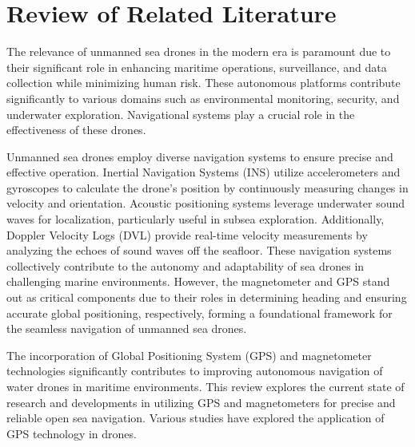 \chapter{Review of Related Literature}

The relevance of unmanned sea drones in the modern era is paramount due to their significant role in enhancing maritime 
operations, surveillance, and data collection while minimizing human risk. These autonomous platforms contribute 
significantly to various domains such as environmental monitoring, security, and underwater exploration. Navigational 
systems play a crucial role in the effectiveness of these drones.

Unmanned sea drones employ diverse navigation systems to ensure precise and effective operation. Inertial Navigation 
Systems (INS) utilize accelerometers and gyroscopes to calculate the drone's position by continuously measuring changes 
in velocity and orientation. Acoustic positioning systems leverage underwater sound waves for localization, particularly 
useful in subsea exploration. Additionally, Doppler Velocity Logs (DVL) provide real-time velocity measurements by 
analyzing the echoes of sound waves off the seafloor. These navigation systems collectively contribute to the autonomy 
and adaptability of sea drones in challenging marine environments. However, the magnetometer and GPS stand out as critical 
components due to their roles in determining heading and ensuring accurate global positioning, respectively, forming a 
foundational framework for the seamless navigation of unmanned sea drones.

The incorporation of Global Positioning System (GPS) and magnetometer technologies significantly contributes to improving
autonomous navigation of water drones in maritime environments. This review explores the current state of research and 
developments in utilizing GPS and magnetometers for precise and reliable open sea navigation. Various studies have explored 
the application of GPS technology in drones.

